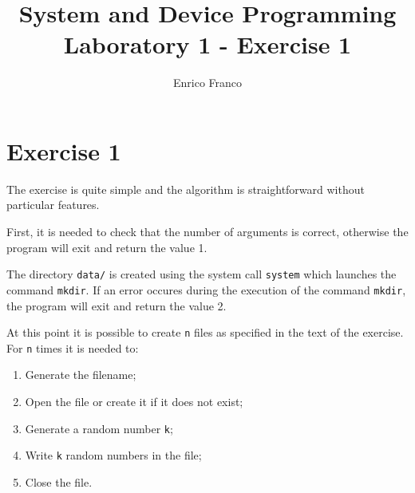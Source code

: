 \documentclass{report}
\author{Enrico Franco}
\title{System and Device Programming \\
	Laboratory 1 - Exercise 1}
\begin{document}
\section*{Exercise 1}
The exercise is quite simple and the algorithm is straightforward without particular features.

First, it is needed to check that the number of arguments is correct, otherwise the program will exit and return the value 1.

The directory \texttt{data/} is created using the system call \texttt{system} which launches the command \texttt{mkdir}. If an error occures during the execution of the command \texttt{mkdir}, the program will exit and return the value 2.

At this point it is possible to create \texttt{n} files as specified in the text of the exercise.
For \texttt{n} times it is needed to:
\begin{enumerate}
\item Generate the filename;
\item Open the file or create it if it does not exist;
\item Generate a random number \texttt{k};
\item Write \texttt{k} random numbers in the file;
\item Close the file.
\end{enumerate}
\end{document}
